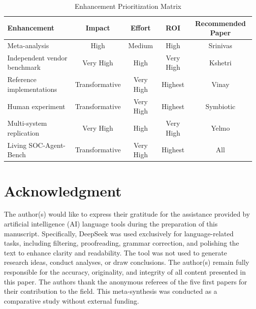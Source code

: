 \documentclass[journal]{IEEEtran}
\begin{document}
\begin{table}[!t]
	\centering
	\caption{Enhancement Prioritization Matrix}
	\label{tab:prioritization}
	\begin{tabular}{|l|c|c|c|c|}
		\hline
		\textbf{Enhancement} & \textbf{Impact} & \textbf{Effort} & \textbf{ROI} & \textbf{Recommended Paper} \\
		\hline
		Meta-analysis & High & Medium & High & Srinivas \\
		\hline
		Independent vendor benchmark & Very High & High & Very High & Kshetri \\
		\hline
		Reference implementations & Transformative & Very High & Highest & Vinay \\
		\hline
		Human experiment & Transformative & Very High & Highest & Symbiotic \\
		\hline
		Multi-system replication & Very High & High & Very High & Yelmo \\
		\hline
		Living SOC-Agent-Bench & Transformative & Very High & Highest & All \\
		\hline
	\end{tabular}
\end{table}

\section*{Acknowledgment}
The author(s) would like to express their gratitude for the assistance provided by artificial intelligence (AI) language tools during the preparation of this manuscript. Specifically, DeepSeek was used exclusively for language-related tasks, including filtering, proofreading, grammar correction, and polishing the text to enhance clarity and readability. The tool was not used to generate research ideas, conduct analyses, or draw conclusions. The author(s) remain fully responsible for the accuracy, originality, and integrity of all content presented in this paper. The authors thank the anonymous referees of the five first papers for their contribution to the field. This meta-synthesis was conducted as a comparative study without external funding.
\end{document}
